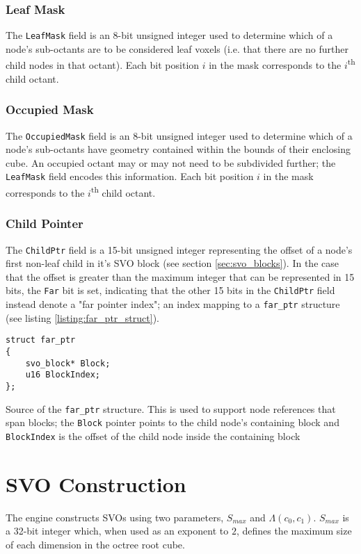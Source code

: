 \subsubsection{Leaf Mask}
The \texttt{LeafMask} field is an 8-bit unsigned integer used to determine which of a node's sub-octants are to be considered leaf voxels (i.e. that there are no further child nodes in that octant). Each bit position $i$ in the mask corresponds to the $i$\textsuperscript{th} child octant.

\subsubsection{Occupied Mask}
The \texttt{OccupiedMask} field is an 8-bit unsigned integer used to determine which of a node's sub-octants have geometry contained within the bounds of their enclosing cube. An occupied octant may or may not need to be subdivided further; the \texttt{LeafMask} field encodes this information. Each bit position $i$ in the mask corresponds to the $i$\textsuperscript{th} child octant.

\subsubsection{Child Pointer}
The \texttt{ChildPtr} field is a 15-bit unsigned integer representing the offset of a node's first non-leaf child in it's SVO block (see section \ref{sec:svo_blocks}). In the case that the offset is greater than the maximum integer that can be represented in 15 bits, the \texttt{Far} bit is set, indicating that the other 15 bits in the \texttt{ChildPtr} field instead denote a "far pointer index"; an index mapping to a \texttt{far\_ptr} structure (see listing \ref{listing:far_ptr_struct}).

\begin{listing}
\begin{verbatim}
struct far_ptr
{
    svo_block* Block;
    u16 BlockIndex;
};
\end{verbatim}
\caption{Source of the \texttt{far\_ptr} structure. This is used to support node references that span blocks; the \texttt{Block} pointer points to the child node's containing block and \texttt{BlockIndex} is the offset of the child node inside the containing block}
\label{listing:far_ptr_struct}
\end{listing}


\section{SVO Construction}
The engine constructs SVOs using two parameters, $S_{max}$ and $\Lambda(c_0, c_1)$. $S_{max}$ is a 32-bit integer which, when used as an exponent to $2$, defines the maximum size of each dimension in the octree root cube.

